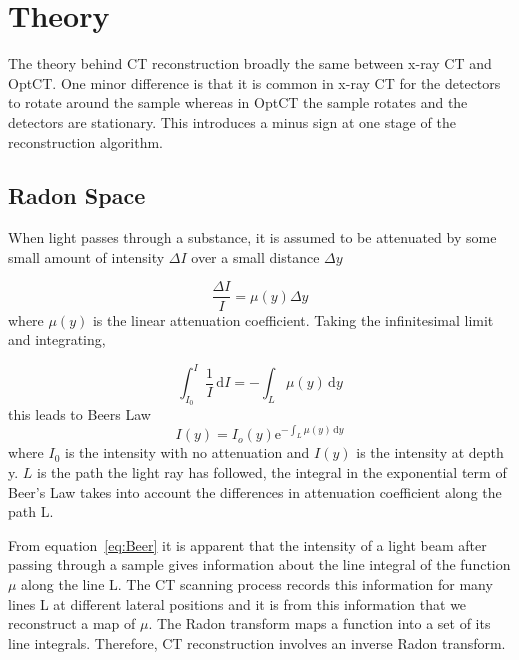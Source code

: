\documentclass[12pt]{article}
\begin{document}
\section{Theory}
\label{sec:theory}

The theory behind CT reconstruction broadly the same between x-ray CT and OptCT. One minor difference is that it is common in x-ray CT for the detectors to rotate around the sample whereas in OptCT the sample rotates and the detectors are stationary. This introduces a minus sign at one stage of the reconstruction algorithm.



\subsection{Radon Space}

When light passes through a substance, it is assumed to be attenuated by some small amount of intensity $\Delta I$ over a small distance $\Delta y$ 

\begin{equation}
\dfrac{\Delta I}{I} = \mu(y)\Delta y
\end{equation}
where $\mu(y)$ is the linear attenuation coefficient.
Taking the infinitesimal limit and integrating, 

\begin{equation}
\int_{I_0}^{I} \frac{1}{I}\, \mathrm{d}I = - \int_L \mu(y)\, \mathrm{d}y
\end{equation}
this leads to Beers Law 
\begin{equation}
I(y) = I_{o}(y)\mathrm{e}^{-\int_L \mu(y)\, \mathrm{d}y}
\label{eq:Beer}
\end{equation}
where $I_0$ is the intensity with no attenuation and $I(y)$ is the intensity at depth y. $L$ is the path the light ray has followed, the integral in the exponential term of Beer's Law takes into account the differences in attenuation coefficient along the path L. 

From equation~\ref{eq:Beer} it is apparent that  the  intensity of a light beam after passing through a sample gives information about the line integral of the function $\mu$  along the line L. The CT scanning process records this information for many lines L at different lateral positions and it is from this information that we reconstruct a map of $\mu$. \cite{natterer2001mathematics}
The Radon transform maps a function into a set of its line integrals. Therefore, CT reconstruction involves an inverse Radon transform.
\end{document}
